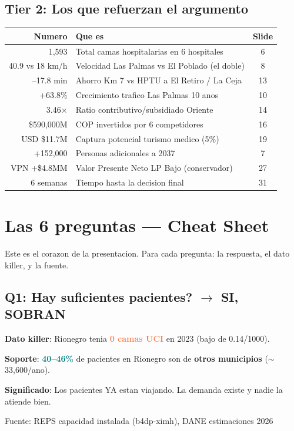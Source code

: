 \documentclass[11pt, a4paper]{article}
\newcommand{\hl}[1]{\textcolor{teal}{\textbf{#1}}}
\newcommand{\dg}[1]{\textcolor{coral}{\textbf{#1}}}
\begin{document}
\subsection{Tier 2: Los que refuerzan el argumento}

{\small
\begin{tabular}{@{}rp{8cm}c@{}}
\toprule
\textbf{Numero} & \textbf{Que es} & \textbf{Slide} \\
\midrule
1,593 & Total camas hospitalarias en 6 hospitales & 6 \\
40.9 vs 18 km/h & Velocidad Las Palmas vs El Poblado (el doble) & 8 \\
--17.8 min & Ahorro Km 7 vs HPTU a El Retiro / La Ceja & 13 \\
+63.8\% & Crecimiento trafico Las Palmas 10 anos & 10 \\
3.46$\times$ & Ratio contributivo/subsidiado Oriente & 14 \\
\$590,000M & COP invertidos por 6 competidores & 16 \\
USD \$11.7M & Captura potencial turismo medico (5\%) & 19 \\
+152,000 & Personas adicionales a 2037 & 7 \\
VPN +\$4.8MM & Valor Presente Neto LP Bajo (conservador) & 27 \\
6 semanas & Tiempo hasta la decision final & 31 \\
\bottomrule
\end{tabular}
}


\section{Las 6 preguntas --- Cheat Sheet}

Este es el corazon de la presentacion. Para cada pregunta: la respuesta, el dato killer, y la fuente.

\subsection{Q1: Hay suficientes pacientes? $\to$ SI, SOBRAN}

\begin{tip}
\textbf{Dato killer}: Rionegro tenia \dg{0 camas UCI} en 2023 (bajo de 0.14/1000).

\vspace{2pt}
\textbf{Soporte}: \hl{40--46\%} de pacientes en Rionegro son de \textbf{otros municipios} ($\sim$33,600/ano).

\vspace{2pt}
\textbf{Significado}: Los pacientes YA estan viajando. La demanda existe y nadie la atiende bien.

\vspace{2pt}
{\small\color{slate}Fuente: REPS capacidad instalada (b4dp-ximh), DANE estimaciones 2026}
\end{tip}
\end{document}
